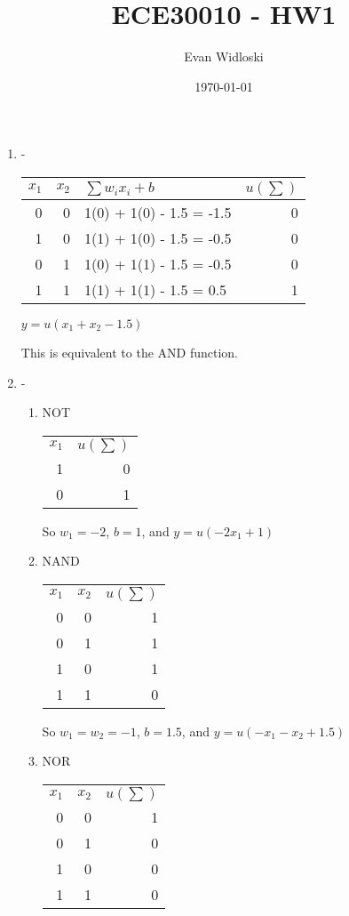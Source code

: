 \documentclass[11pt]{article}
\author{Evan Widloski}
\date{\today}
\title{ECE30010 - HW1}
\begin{document}
\maketitle
\begin{enumerate}
\item -
\begin{center}
\begin{tabular}{r|r|l|r}
\(x_1\) & \(x_2\) & \(\sum w_ix_i + b\) & \(u(\sum)\)\\
\hline
0 & 0 & 1(0) + 1(0) - 1.5 = -1.5 & 0\\
1 & 0 & 1(1) + 1(0) - 1.5 = -0.5 & 0\\
0 & 1 & 1(0) + 1(1) - 1.5 = -0.5 & 0\\
1 & 1 & 1(1) + 1(1) - 1.5 = 0.5 & 1\\
\end{tabular}
\end{center}

\(y = u(x_1 + x_2 - 1.5)\)

This is equivalent to the AND function.

\item -
\begin{enumerate}
\item NOT
\begin{center}
\begin{tabular}{rr}
\(x_1\) & \(u(\sum)\)\\
1 & 0\\
0 & 1\\
\end{tabular}
\end{center}

So \(w_1 = -2\), \(b = 1\), and \(y = u(-2x_1 + 1)\)

\item NAND
\begin{center}
\begin{tabular}{r|r|r}
\(x_1\) & \(x_2\) & \(u(\sum)\)\\
0 & 0 & 1\\
0 & 1 & 1\\
1 & 0 & 1\\
1 & 1 & 0\\
\end{tabular}
\end{center}

So \(w_1 = w_2 = -1\), \(b = 1.5\), and \(y = u(-x_1 - x_2  + 1.5)\)

\item NOR
\begin{center}
\begin{tabular}{r|r|r}
\(x_1\) & \(x_2\) & \(u(\sum)\)\\
0 & 0 & 1\\
0 & 1 & 0\\
1 & 0 & 0\\
1 & 1 & 0\\
\end{tabular}
\end{center}


\end{enumerate}
\end{enumerate}
\end{document}
